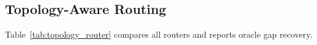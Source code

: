 \documentclass[11pt]{article}
\begin{document}
\subsection{Topology-Aware Routing}
\label{sec:topology_routing}

Table~\ref{tab:topology_router} compares all routers and reports oracle gap recovery.

\end{document}
